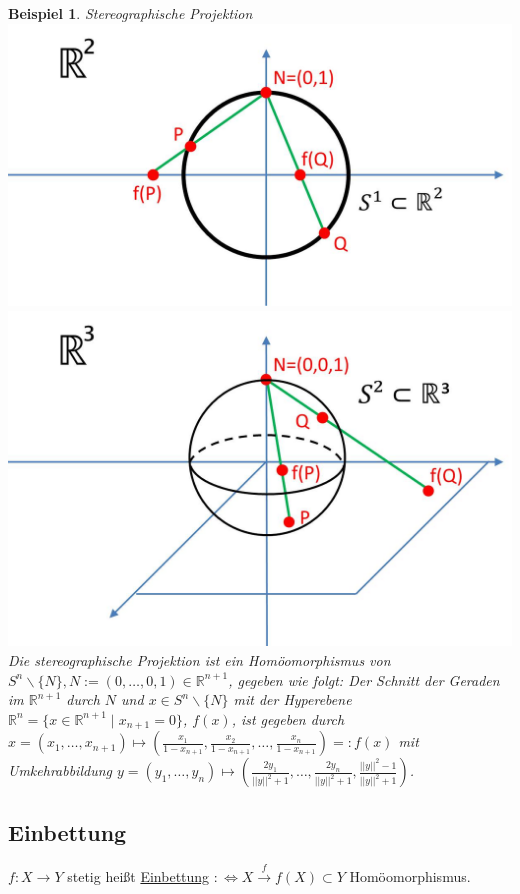 \documentclass[a4paper,11pt,notitlepage]{report}
\newtheorem{example}{Beispiel}[chapter]
\newcommand{\R}{{\ensuremath{\mathbb{R}}}}
\newenvironment{Kasten}[1]
{
\hspace{0.05\linewidth}
\begin{center}
\begin{minipage}{0.9\linewidth}
\setlength{\fboxsep}{10pt}
\definecolor{shadecolor}{gray}{1}
\definecolor{framecolor}{gray}{0}
\def\FrameCommand{\fcolorbox{framecolor}{shadecolor}}
\MakeFramed {\FrameRestore}
\subsection{#1}
\begin{itshape}
}
{
\end{itshape}
\endMakeFramed
\end{minipage}
\end{center}
}
\begin{document}
\begin{example}{Stereographische Projektion}\newline
	\includegraphics[scale=0.35]{images/Stereographie_S1_R1.jpg}
	\includegraphics[scale=0.35]{images/Stereographie_S2_R2.jpg}
	\newline
	Die stereographische Projektion ist ein Homöomorphismus von $S^n \backslash \{N\}, N := (0, \ldots, 0, 1) \in \R^{n+1}$, gegeben wie folgt:
	\newline
	Der Schnitt der Geraden im $\R^{n+1}$ durch $N$ und $x \in S^n \backslash \{N\}$ mit der Hyperebene $\R^n=\{x \in \R^{n+1} \mid x_{n+1} = 0 \}$, $f(x)$, ist gegeben durch $x = (x_1, \ldots, x_{n+1}) \mapsto (\frac{x_1}{1-x_{n+1}}, \frac{x_2}{1-x_{n+1}}, \ldots, \frac{x_n}{1-x_{n+1}}) =: f(x)$ mit Umkehrabbildung $y = (y_1, \ldots, y_n) \mapsto (\frac{2 y_1}{||y||^2+1}, \ldots, \frac{2 y_n}{||y||^2+1},\frac{||y||^2-1}{||y||^2+1})$.
\end{example}

\begin{Kasten}{Einbettung}
	$f \colon X \rightarrow Y$ stetig heißt \underline{Einbettung} $:\Leftrightarrow X \overset{f}{\rightarrow}f(X) \subset Y$ Homöomorphismus.
\end{Kasten}
\end{document}
